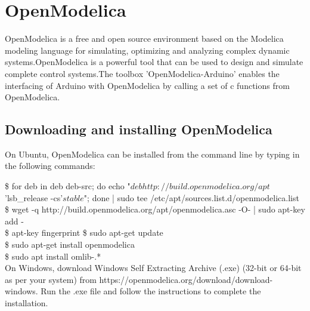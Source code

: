 \begin{juliacode}
      \label{julia:test-firmware}
      
\end{juliacode}






\section{OpenModelica}
\label{sec:OpenModelica-start}
OpenModelica is a free and open source environment based on the Modelica modeling language for simulating, optimizing and analyzing complex
dynamic systems.OpenModelica is a powerful tool that can be used to design and
simulate complete control systems.The toolbox 'OpenModelica-Arduino'
enables the interfacing of Arduino with OpenModelica by calling a set of c functions
from OpenModelica.   




\subsection{Downloading and installing OpenModelica}\label{OpenModelica-installation}

On Ubuntu, OpenModelica can be installed from the command line by typing in the 
following commands:

\$ for deb in deb deb-src; do echo "$deb http://build.openmodelica.org/apt $'lsb\_release -cs'$ stable$"; done | sudo tee /etc/apt/sources.list.d/openmodelica.list \\
\$ wget -q http://build.openmodelica.org/apt/openmodelica.asc -O- | sudo apt-key add -  \\
\$ apt-key fingerprint
\$ sudo apt-get update \\
\$ sudo apt-get install openmodelica \\
\$ sudo apt install omlib-.* \\
On Windows,
download Windows Self Extracting Archive (.exe)  (32-bit or 64-bit as per your system) from https://openmodelica.org/download/download-windows. Run the .exe file and follow the instructions to complete the
installation.


